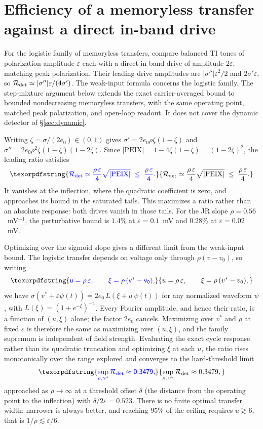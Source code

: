 \documentclass[11pt,a4paper]{article}
\newcommand{\Sig}{\sigma}
\providecommand{\DIFaddtex}[1]{{\protect\color{blue} \sf #1}} %
\providecommand{\DIFadd}[1]{\texorpdfstring{\DIFaddtex{#1}}{#1}} %
\begin{document}
\section{\DIFadd{Efficiency of a memoryless transfer against a direct in-band drive}}\label{app:bound}
\DIFadd{For the logistic family of memoryless transfers, compare balanced TI tones of
polarization amplitude $\varepsilon$ each with a direct in-band drive of amplitude
$2\varepsilon$, matching peak polarization. Their leading drive amplitudes are
$|\Sig''|\varepsilon^2/2$ and $2\Sig'\varepsilon$, so
$\mathcal R_{\rm det}\simeq|\Sig''|\varepsilon/(4\Sig')$.
The weak-input formula concerns the logistic family. The step-mixture argument
below extends the exact carrier-averaged bound to bounded nondecreasing
memoryless transfers, with the same operating point, matched peak polarization,
and open-loop readout. It does not cover the dynamic detector of \S\ref{sec:dynamic}.
}

\DIFadd{Writing $\zeta=\Sig/(2e_0)\in(0,1)$ gives
$\Sig'=2e_0\rho\zeta(1-\zeta)$ and
$\Sig''=2e_0\rho^2\zeta(1-\zeta)(1-2\zeta)$. Since
$|\mathrm{PEIX}|=1-4\zeta(1-\zeta)=(1-2\zeta)^2$, the leading ratio satisfies
}\begin{equation}
\DIFadd{\mathcal R_{\rm det}\simeq\frac{\rho\,\varepsilon}{4}\sqrt{|\mathrm{PEIX}|}
\;\le\;\frac{\rho\,\varepsilon}{4}.
\label{eq:etabound}
}\end{equation}
\DIFadd{It vanishes at the inflection, where the quadratic coefficient is zero, and
approaches its bound in the saturated tails. This maximizes a ratio rather than
an absolute response: both drives vanish in those tails. For the JR slope
$\rho=0.56$~mV$^{-1}$, the perturbative bound is $1.4\%$ at
$\varepsilon=0.1$~mV and $0.28\%$ at $\varepsilon=0.02$~mV.
}

\DIFadd{Optimizing over the sigmoid slope gives a different limit from the weak-input bound.
The logistic transfer depends on voltage only through $\rho(v-v_0)$, so writing
}\begin{equation}
\DIFadd{u=\rho\,\varepsilon,\qquad \xi=\rho\,(v^*-v_0),
\label{eq:reduced}
}\end{equation}
\DIFadd{we have $\Sig(v^*+\varepsilon\psi(t))=2e_0\,L(\xi+u\,\psi(t))$ for any normalized waveform $\psi$,
with $L(\xi)=(1+e^{-\xi})^{-1}$. Every Fourier amplitude, and hence their ratio, is a function
of $(u,\xi)$ alone; the factor $2e_0$ cancels. Maximizing over $v^*$ and $\rho$ at fixed
$\varepsilon$ is therefore the same as maximizing over $(u,\xi)$, and the family supremum is
independent of field strength. Evaluating the exact cycle response rather than its
quadratic truncation and optimizing $\xi$ at each $u$, the ratio rises monotonically over the
range explored and converges to the hard-threshold limit
}\begin{equation}
\DIFadd{\sup_{\rho,\,v^*}\mathcal R_{\rm det}\approx0.3479 ,
\label{eq:etasup}
}\end{equation}
\DIFadd{approached as $\rho\to\infty$ at a threshold offset $\delta$ (the distance from the
operating point to the inflection) with $\delta/2\varepsilon=0.523$. There is no
finite optimal transfer width: narrower is always better, and reaching $95\%$ of the ceiling
requires $u\gtrsim6$, that is $1/\rho\lesssim\varepsilon/6$.
}
\end{document}

